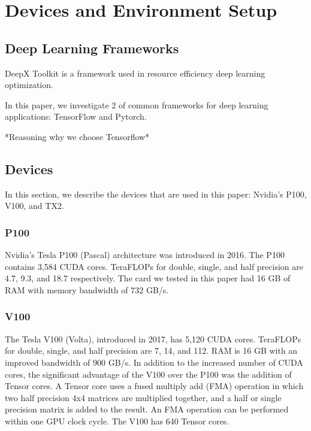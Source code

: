 \documentclass[conference]{IEEEtran}
\begin{document}
\section{Devices and Environment Setup}

\subsection{Deep Learning Frameworks}
DeepX Toolkit is a framework used in resource efficiency deep learning optimization.

In this paper, we investigate 2 of common frameworks for deep learning applications: TensorFlow and Pytorch.

*Reasoning why we choose Tensorflow*

\subsection{Devices}
In this section, we describe the devices that are used in this paper: Nvidia's P100, V100, and TX2.

\subsubsection{P100}

Nvidia's Tesla P100 (Pascal) architecture was introduced in 2016. The P100 contains 3,584 CUDA cores. TeraFLOPs for double, single, and half precision are 4.7, 9.3, and 18.7 respectively. The card we tested in this paper had 16 GB of RAM with memory bandwidth of  732 GB/s.

\subsubsection{V100}

The Tesla V100 (Volta), introduced in 2017, has 5,120 CUDA cores. TeraFLOPs for double, single, and half precision are 7, 14, and 112. RAM is 16 GB with an improved bandwidth of 900 GB/s. In addition to the increased number of CUDA cores, the significant advantage of the V100 over the P100 was the addition of Tensor cores. A Tensor core uses a fused multiply add (FMA) operation in which two half precision 4x4 matrices are multiplied together, and a half or single precision matrix is added to the result. An FMA operation can be performed within one GPU clock cycle. The V100 has 640 Tensor cores.
\end{document}
